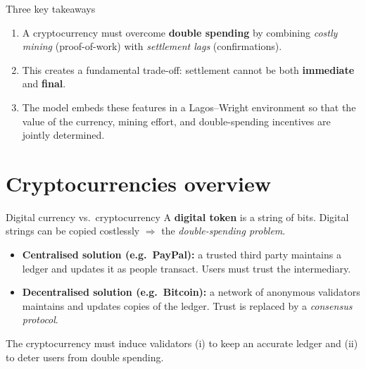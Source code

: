 \documentclass[aspectratio=169,xcolor=dvipsnames]{beamer}
\begin{document}
\begin{frame}{Three key takeaways}
    \begin{enumerate}
        \item A cryptocurrency must overcome \textbf{double spending} by combining \emph{costly mining}
              (proof-of-work) with \emph{settlement lags} (confirmations).
        \vspace{2mm}
        \item This creates a fundamental trade-off: settlement cannot be both
              \textbf{immediate} and \textbf{final}.
        \vspace{2mm}
        \item The model embeds these features in a Lagos--Wright environment so that
              the value of the currency, mining effort, and double-spending incentives
              are jointly determined.
    \end{enumerate}
\end{frame}

\section{Cryptocurrencies overview}

\begin{frame}{Digital currency vs.\ cryptocurrency}
    A \textbf{digital token} is a string of bits. Digital strings can be copied costlessly
    $\Rightarrow$ the \emph{double-spending problem}.
    \vspace{3mm}
    \begin{itemize}
        \item \textbf{Centralised solution (e.g.\ PayPal):} a trusted third party
        maintains a ledger and updates it as people transact. Users must trust the intermediary.
        \vspace{2mm}
        \item \textbf{Decentralised solution (e.g.\ Bitcoin):} a network of anonymous validators
        maintains and updates copies of the ledger. Trust is replaced by a \emph{consensus protocol}.
    \end{itemize}
    \vspace{3mm}
    The cryptocurrency must induce validators (i) to keep an accurate ledger and (ii) to
    deter users from double spending.
\end{frame}
\end{document}
